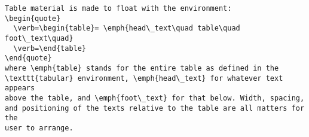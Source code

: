 \documentclass{article}
\begin{document}

\begin{verbatim}
Table material is made to float with the environment:
\begin{quote}
  \verb=\begin{table}= \emph{head\_text\quad table\quad foot\_text\quad}
  \verb=\end{table}
\end{quote}
where \emph{table} stands for the entire table as defined in the
\texttt{tabular} environment, \emph{head\_text} for whatever text appears
above the table, and \emph{foot\_text} for that below. Width, spacing,
and positioning of the texts relative to the table are all matters for the
user to arrange.
\end{verbatim}
\end{document}
